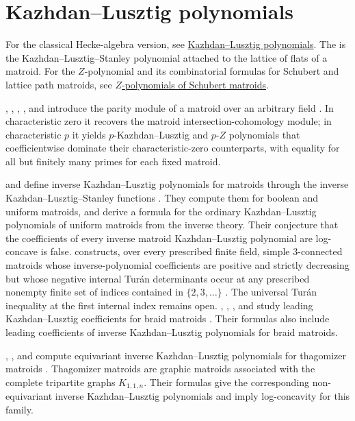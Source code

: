 \section[KazhdanLusztig]{Kazhdan--Lusztig polynomials}
\label{matroidKazhdanLusztigPolynomial}

For the classical Hecke-algebra version, see
\hyperref[kazhdanLusztigPolynomials]{Kazhdan--Lusztig polynomials}.
The  is the
Kazhdan--Lusztig--Stanley polynomial attached to the lattice of flats of a
matroid.
For the $Z$-polynomial and its combinatorial formulas for Schubert and lattice
path matroids, see \hyperref[schubertMatroidZ]{$Z$-polynomials of Schubert
matroids}.

, , ,
, and  introduce the parity module
of a matroid over an arbitrary field \cite{BradenHuhMatherneProudfootWang2026x}.
In characteristic zero it recovers the matroid intersection-cohomology module;
in characteristic $p$ it yields $p$-Kazhdan--Lusztig and $p$-$Z$ polynomials
that coefficientwise dominate their characteristic-zero counterparts, with
equality for all but finitely many primes for each fixed matroid.

 and  define inverse
Kazhdan--Lusztig polynomials for matroids through the inverse
Kazhdan--Lusztig--Stanley functions \cite{GaoXie2021}.  They compute them
for boolean and uniform matroids, and derive a formula for the ordinary
Kazhdan--Lusztig polynomials of uniform matroids from the inverse theory.
Their conjecture that the coefficients of every inverse matroid
Kazhdan--Lusztig polynomial are log-concave is false.  
constructs, over every prescribed finite field, simple $3$-connected matroids
whose inverse-polynomial coefficients are positive and strictly decreasing
but whose negative internal Tur{\'a}n determinants occur at any prescribed
nonempty finite set of indices contained in $\{2,3,\dotsc\}$
\cite[Thm.~C]{Badalov2026x}.  The universal Tur{\'a}n inequality at the first
internal index remains open.
, ,
, and  study leading
Kazhdan--Lusztig coefficients for braid matroids
\cite{GaoProudfootYangZhang2023x}.  Their formulas also include leading
coefficients of inverse Kazhdan--Lusztig polynomials for braid matroids.

, , and 
compute equivariant inverse Kazhdan--Lusztig polynomials for thagomizer
matroids \cite{GaoLiXie2025x}.  Thagomizer matroids are graphic matroids associated with
the complete tripartite graphs $K_{1,1,n}$.  Their formulas give the
corresponding non-equivariant inverse Kazhdan--Lusztig polynomials and imply
log-concavity for this family.

